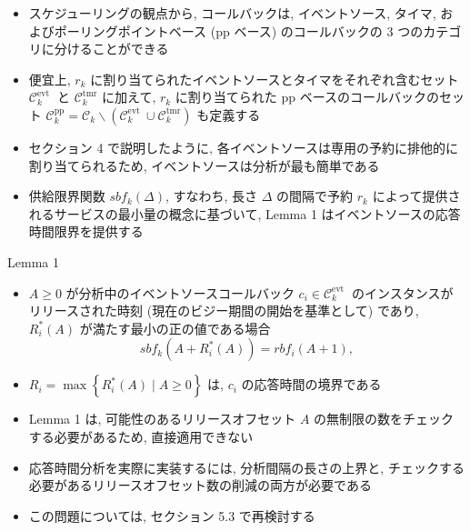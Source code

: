 \begin{frame}{}
    \begin{itemize}
        \item スケジューリングの観点から, コールバックは, イベントソース, タイマ, およびポーリングポイントベース (pp ベース) のコールバックの 3 つのカテゴリに分けることができる
\item 便宜上, $r_{k}$ に割り当てられたイベントソースとタイマをそれぞれ含むセット $\mathcal{C}_{k}^{\text {evt }}$ と $\mathcal{C}_{k}^{\mathrm{tmr}}$ に加えて, $r_{k}$ に割り当てられた pp ベースのコールバックのセット $\mathcal{C}_{k}^{\mathrm{pp}}=\mathcal{C}_{k} \backslash\left(\mathcal{C}_{k}^{\text {evt }} \cup \mathcal{C}_{k}^{\mathrm{tmr}}\right)$ も定義する
\item セクション 4 で説明したように, 各イベントソースは専用の予約に排他的に割り当てられるため, イベントソースは分析が最も簡単である
\item 供給限界関数 $s b f_{k}(\Delta)$, すなわち, 長さ $\Delta$ の間隔で予約 $r_{k}$ によって提供されるサービスの最小量の概念に基づいて, Lemma 1 はイベントソースの応答時間限界を提供する
    \end{itemize}
\end{frame}

\begin{frame}[label=lemma1]{Lemma 1}
    \begin{lemma}[]
        \begin{itemize}
            \item $A \geq 0$ が分析中のイベントソースコールバック $c_{i} \in \mathcal{C}_{k}^{\text {evt }}$ のインスタンスがリリースされた時刻 (現在のビジー期間の開始を基準として) であり, $R_{i}^{*}(A)$ が満たす最小の正の値である場合
                  \begin{equation*}
                      s b f_{k}\left(A+R_{i}^{*}(A)\right)=r b f_{i}(A+1),
                  \end{equation*}

            \item $R_{i}=\max \left\{R_{i}^{*}(A) \mid A \geq 0\right\}$ は, $c_{i}$ の応答時間の境界である
        \end{itemize}
    \end{lemma}
\end{frame}

\begin{frame}{}
    \begin{itemize}
        \item Lemma 1 は, 可能性のあるリリースオフセット $A$ の無制限の数をチェックする必要があるため, 直接適用できない
\item 応答時間分析を実際に実装するには, 分析間隔の長さの上界と, チェックする必要があるリリースオフセット数の削減の両方が必要である
\item この問題については, セクション 5.3 で再検討する
    \end{itemize}
\end{frame}

